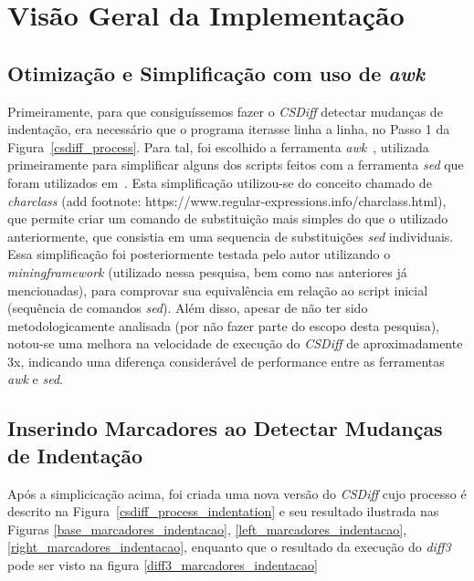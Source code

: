 \section{Visão Geral da Implementação}\label{implementacao}
\subsection{Otimização e Simplificação com uso de \emph{awk}}
Primeiramente, para que consiguíssemos fazer o \emph{CSDiff} detectar mudanças de indentação, era necessário
que o programa iterasse linha a linha, no Passo 1 da Figura~\ref{csdiff_process}.
Para tal, foi escolhido a ferramenta \emph{awk}~\cite{awk}, utilizada primeiramente para
simplificar alguns dos scripts feitos com a ferramenta \emph{sed} que foram utilizados em~\cite{clem21,heitor21}.
Esta simplificação
utilizou-se do conceito chamado de \emph{charclass} (add footnote: https://www.regular-expressions.info/charclass.html), que
permite criar um comando de substituição mais simples do que o utilizado anteriormente, que consistia em uma sequencia de
substituições \emph{sed} individuais. Essa simplificação foi posteriormente testada pelo autor utilizando
o \emph{miningframework} (utilizado nessa pesquisa, bem como nas anteriores já mencionadas), para comprovar sua equivalência em
relação ao script inicial (sequência de comandos \emph{sed}). Além disso, apesar de não ter sido
metodologicamente analisada (por não fazer parte do escopo desta pesquisa),
notou-se uma melhora na velocidade de execução do
\emph{CSDiff} de aproximadamente 3x, indicando uma diferença considerável de performance entre as ferramentas
\emph{awk} e \emph{sed}.

\subsection{Inserindo Marcadores ao Detectar Mudanças de Indentação}
Após a simplicicação acima, foi criada uma nova versão do \emph{CSDiff} cujo processo é descrito na
Figura~\ref{csdiff_process_indentation} e seu resultado ilustrada nas Figuras \ref{base_marcadores_indentacao},
\ref{left_marcadores_indentacao},
\ref{right_marcadores_indentacao}, enquanto que o resultado da execução do \emph{diff3} pode ser visto na figura
\ref{diff3_marcadores_indentacao}

